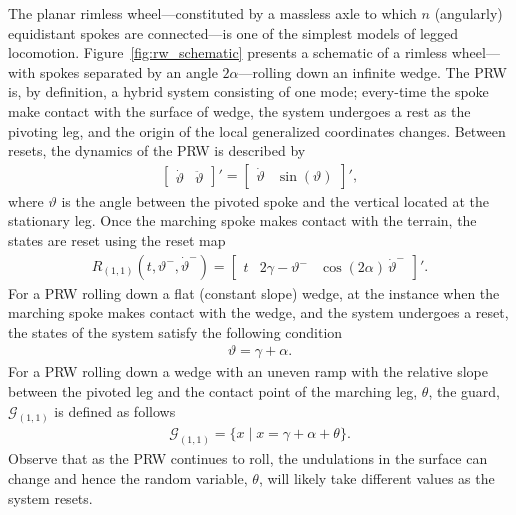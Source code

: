 \begin{example}
\label{example:rw}
  The planar rimless wheel---constituted by a massless axle to which $n$ (angularly) equidistant spokes are connected---is one of the simplest models of legged locomotion. Figure~\ref{fig:rw_schematic} presents a schematic of a rimless wheel---with spokes separated by an angle $2\alpha$---rolling down an infinite wedge. The PRW is, by definition, a hybrid system consisting of one mode; every-time the spoke make contact with the surface of wedge, the system undergoes a rest as the pivoting leg, and the origin of the local generalized coordinates changes. Between resets, the dynamics of the PRW is described by
\begin{align}
  \begin{bmatrix}
    \dot \vartheta& \ddot\vartheta
  \end{bmatrix}'=\begin{bmatrix}
    \dot\vartheta&\sin(\vartheta)
  \end{bmatrix}',
\end{align}
where $\vartheta$ is the angle between the pivoted spoke and the vertical located at the stationary leg. Once the marching spoke makes contact with the terrain, the states are reset using the reset map
\begin{align}
R_{(1,1)}(t,\vartheta^-,\dot \vartheta^-)=\begin{bmatrix}t&
    2\gamma-\vartheta^-&
    \cos(2\alpha)\,\dot\vartheta^-
  \end{bmatrix}'.
\end{align}
For a PRW rolling down a flat (constant slope) wedge, at the instance when the marching spoke makes contact with the wedge, and the system undergoes a reset, the states of the system satisfy the following condition
\begin{align}
\vartheta = \gamma+\alpha.
\end{align}
For a PRW rolling down a wedge with an uneven ramp with the relative slope between the pivoted leg and the contact point of the marching leg, $\theta$, the guard, $\mathcal G_{(1,1)}$ is defined as follows
\begin{align}
\mathcal G_{(1,1)}=\{x\mid x=\gamma+\alpha+\theta\}.
\end{align}
Observe that as the PRW continues to roll, the undulations in the surface can change and hence the random variable, $\theta$, will likely take different values as the system resets.
\end{example}
